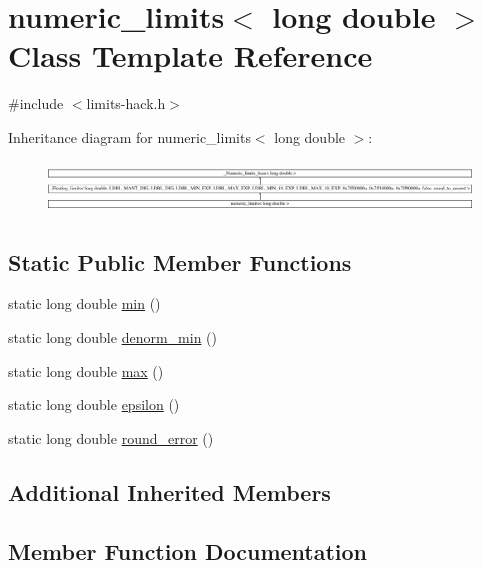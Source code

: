 \hypertarget{classnumeric__limits_3_01long_01double_01_4}{}\section{numeric\+\_\+limits$<$ long double $>$ Class Template Reference}
\label{classnumeric__limits_3_01long_01double_01_4}


{\ttfamily \#include $<$limits-\/hack.\+h$>$}

Inheritance diagram for numeric\+\_\+limits$<$ long double $>$\+:\begin{figure}[H]
\begin{center}
\leavevmode
\includegraphics[height=1.378179cm]{classnumeric__limits_3_01long_01double_01_4}
\end{center}
\end{figure}
\subsection*{Static Public Member Functions}
\begin{DoxyCompactItemize}
\item 
static long double \hyperlink{classnumeric__limits_3_01long_01double_01_4_a2b3657a792f5828e790b39012d8a8392}{min} ()
\item 
static long double \hyperlink{classnumeric__limits_3_01long_01double_01_4_ae8820ad70b18dd6cb9809835fb5e761b}{denorm\+\_\+min} ()
\item 
static long double \hyperlink{classnumeric__limits_3_01long_01double_01_4_ab06f309695ac490256a3764279ef37d7}{max} ()
\item 
static long double \hyperlink{classnumeric__limits_3_01long_01double_01_4_acfc10e2a6a991c35e9443c11616aeea8}{epsilon} ()
\item 
static long double \hyperlink{classnumeric__limits_3_01long_01double_01_4_aa759d336da320c096898eb4faf6c7d71}{round\+\_\+error} ()
\end{DoxyCompactItemize}
\subsection*{Additional Inherited Members}


\subsection{Member Function Documentation}
\hypertarget{classnumeric__limits_3_01long_01double_01_4_ae8820ad70b18dd6cb9809835fb5e761b}{}
